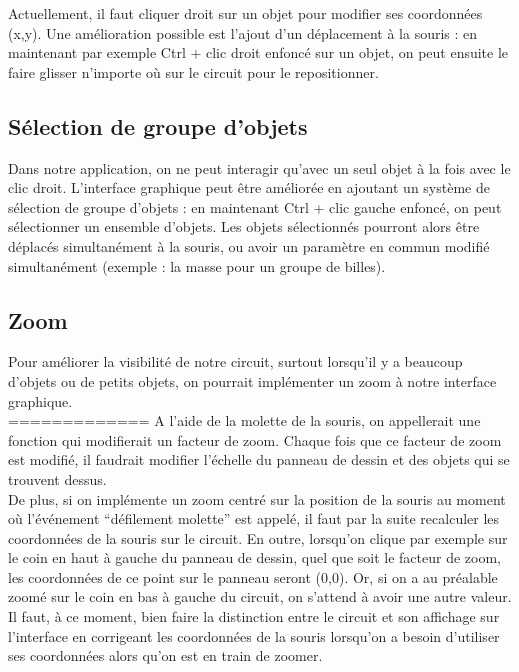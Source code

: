 \documentclass{report}
\begin{document}
Actuellement, il faut cliquer droit sur un objet pour modifier ses coordonnées (x,y). Une amélioration possible est l’ajout d’un déplacement à la souris : en maintenant par exemple Ctrl + clic droit enfoncé sur un objet, on peut ensuite le faire glisser n’importe où sur le circuit pour le repositionner.

\subsection{Sélection de groupe d'objets}

Dans notre application, on ne peut interagir qu’avec un seul objet à la fois avec le clic droit. L’interface graphique peut être améliorée en ajoutant un système de sélection de groupe d’objets : en maintenant Ctrl + clic gauche enfoncé, on peut sélectionner un ensemble d’objets. Les objets sélectionnés pourront alors être déplacés simultanément à la souris, ou avoir un paramètre en commun modifié simultanément (exemple : la masse pour un groupe de billes).

\subsection{Zoom}

Pour améliorer la visibilité de notre circuit, surtout lorsqu’il y a beaucoup d’objets ou de petits objets, on pourrait implémenter un zoom à notre interface graphique. \\
=============
A l’aide de la molette de la souris, on appellerait une fonction qui modifierait un facteur de zoom. Chaque fois que ce facteur de zoom est modifié, il faudrait modifier l’échelle du panneau de dessin et des objets qui se trouvent dessus. \\

De plus, si on implémente un zoom centré sur la position de la souris au moment où l’événement “défilement molette” est appelé, il faut par la suite recalculer les coordonnées de la souris sur le circuit. En outre, lorsqu’on clique par exemple sur le coin en haut à gauche du panneau de dessin, quel que soit le facteur de zoom, les coordonnées de ce point sur le panneau seront (0,0). Or, si on a au préalable zoomé sur le coin en bas à gauche du circuit, on s’attend à avoir une autre valeur. \\

Il faut, à ce moment, bien faire la distinction entre le circuit et son affichage sur l’interface en corrigeant les coordonnées de la souris lorsqu’on a besoin d’utiliser ses coordonnées alors qu’on est en train de zoomer.
\end{document}
